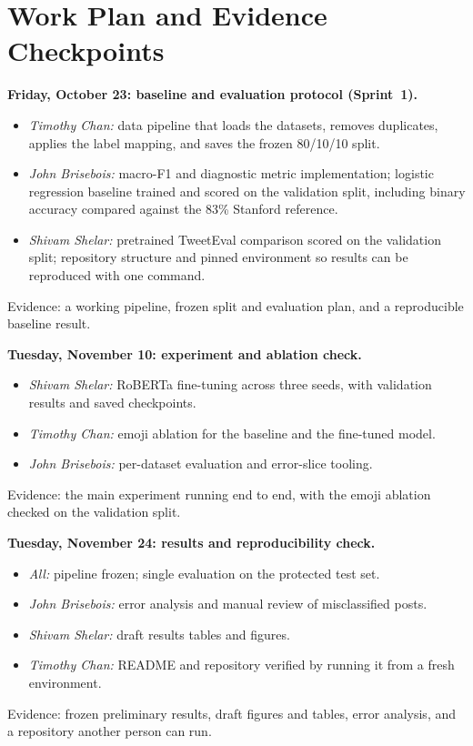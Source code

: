 \documentclass[sigconf,nonacm]{acmart}
\begin{document}
\section{Work Plan and Evidence Checkpoints}
\textbf{Friday, October 23: baseline and evaluation protocol (Sprint~1).}
\begin{itemize}
\item \emph{Timothy Chan:} data pipeline that loads the datasets, removes duplicates, applies the label mapping, and saves the frozen 80/10/10 split.
\item \emph{John Brisebois:} macro-F1 and diagnostic metric implementation; logistic regression baseline trained and scored on the validation split, including binary accuracy compared against the 83\% Stanford reference.
\item \emph{Shivam Shelar:} pretrained TweetEval comparison scored on the validation split; repository structure and pinned environment so results can be reproduced with one command.
\end{itemize}
Evidence: a working pipeline, frozen split and evaluation plan, and a reproducible baseline result.
 
\textbf{Tuesday, November 10: experiment and ablation check.}
\begin{itemize}
\item \emph{Shivam Shelar:} RoBERTa fine-tuning across three seeds, with validation results and saved checkpoints.
\item \emph{Timothy Chan:} emoji ablation for the baseline and the fine-tuned model.
\item \emph{John Brisebois:} per-dataset evaluation and error-slice tooling.
\end{itemize}
Evidence: the main experiment running end to end, with the emoji ablation checked on the validation split.
 
\textbf{Tuesday, November 24: results and reproducibility check.}
\begin{itemize}
\item \emph{All:} pipeline frozen; single evaluation on the protected test set.
\item \emph{John Brisebois:} error analysis and manual review of misclassified posts.
\item \emph{Shivam Shelar:} draft results tables and figures.
\item \emph{Timothy Chan:} README and repository verified by running it from a fresh environment.
\end{itemize}
Evidence: frozen preliminary results, draft figures and tables, error analysis, and a repository another person can run.
 
\end{document}
